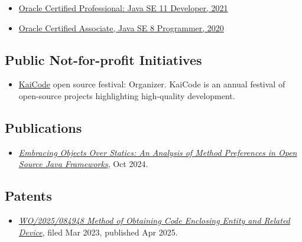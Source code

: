 \documentclass{vl}
\begin{document}
    \begin{itemize}
        \itemsep0em
        \item \href{https://catalog-education.oracle.com/pls/certview/sharebadge?id=87F6A2FE819A5A5AF4120A05900AB28A461EE9A3EE9FBFA02721FADAEB3BCE19}{Oracle Certified Professional: Java SE 11 Developer, 2021}
        \item \href{https://www.credly.com/badges/e2d9ddda-20dc-433d-8ab7-18548fd0fd8f/public_url}{Oracle Certified Associate, Java SE 8 Programmer, 2020}
    \end{itemize}

    \subsection*{Public Not-for-profit Initiatives}
    \begin{itemize}
        \itemsep0em
        \item \href{https://www.kaicode.org}{KaiCode} open source festival: Organizer.
        KaiCode is an annual festival of open-source projects highlighting high-quality development.
    \end{itemize}

    \subsection*{Publications}
    \begin{itemize}
        \itemsep0em
        \item\emph{\href{https://arxiv.org/abs/2410.05631}{Embracing Objects Over Statics:
        An Analysis of Method Preferences
        in Open Source Java Frameworks}}, Oct 2024.
    \end{itemize}

    \subsection*{Patents}
    \begin{itemize}
        \itemsep0em
        \item\emph{\href{https://patentscope.wipo.int/search/en/detail.jsf?docId=WO2025084948&_cid=P20-ME9V9B-07633-1}{WO/2025/084948 Method of Obtaining Code Enclosing Entity and Related Device}}, filed Mar 2023, published Apr 2025.
    \end{itemize}
\end{document}

